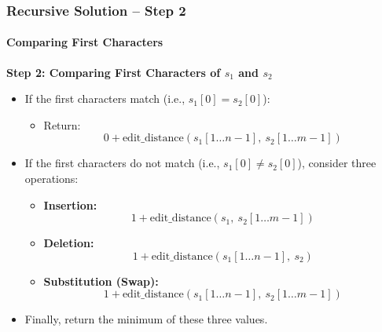 \documentclass[10pt,aspectratio=43]{beamer}
\begin{document}
\begin{frame}
    \frametitle{Recursive Solution – Step 2}
    \framesubtitle{Comparing First Characters}

    \textbf{Step 2: Comparing First Characters of $s_1$ and $s_2$}

    \vspace{0.3cm}

    \begin{itemize}
        \item If the first characters match (i.e., $s_1[0] = s_2[0]$):
        \begin{itemize}
            \item Return:
            \[
            0 + \text{edit\_distance}(s_1[1 \ldots n-1],\ s_2[1 \ldots m-1])
            \]
        \end{itemize}

        \vspace{0.3cm}

        \item If the first characters do not match (i.e., $s_1[0] \neq s_2[0]$), consider three operations:
        \begin{itemize}
            \item \textbf{Insertion:}
            \[
            1 + \text{edit\_distance}(s_1,\ s_2[1 \ldots m-1])
            \]

            \item \textbf{Deletion:}
            \[
            1 + \text{edit\_distance}(s_1[1 \ldots n-1],\ s_2)
            \]

            \item \textbf{Substitution (Swap):}
            \[
            1 + \text{edit\_distance}(s_1[1 \ldots n-1],\ s_2[1 \ldots m-1])
            \]
        \end{itemize}

        \vspace{0.3cm}

        \item Finally, return the minimum of these three values.
    \end{itemize}
\end{frame}
\end{document}

